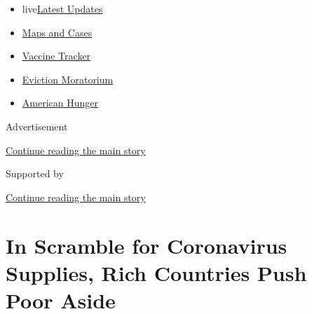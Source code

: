 \begin{itemize}
\tightlist
\item
  live\href{https://www.nytimes3xbfgragh.onion/2020/09/08/world/covid-19-coronavirus.html?name=styln-coronavirus-national\&region=TOP_BANNER\&block=storyline_menu_recirc\&action=click\&pgtype=Article\&impression_id=97e055b1-f1f3-11ea-861d-9f9fbf97bb3c\&variant=undefined}{Latest
  Updates}
\item
  \href{https://www.nytimes3xbfgragh.onion/interactive/2020/us/coronavirus-us-cases.html?name=styln-coronavirus-national\&region=TOP_BANNER\&block=storyline_menu_recirc\&action=click\&pgtype=Article\&impression_id=97e055b2-f1f3-11ea-861d-9f9fbf97bb3c\&variant=undefined}{Maps
  and Cases}
\item
  \href{https://www.nytimes3xbfgragh.onion/interactive/2020/science/coronavirus-vaccine-tracker.html?name=styln-coronavirus-national\&region=TOP_BANNER\&block=storyline_menu_recirc\&action=click\&pgtype=Article\&impression_id=97e07cc0-f1f3-11ea-861d-9f9fbf97bb3c\&variant=undefined}{Vaccine
  Tracker}
\item
  \href{https://www.nytimes3xbfgragh.onion/2020/09/02/your-money/eviction-moratorium-covid.html?name=styln-coronavirus-national\&region=TOP_BANNER\&block=storyline_menu_recirc\&action=click\&pgtype=Article\&impression_id=97e07cc1-f1f3-11ea-861d-9f9fbf97bb3c\&variant=undefined}{Eviction
  Moratorium}
\item
  \href{https://www.nytimes3xbfgragh.onion/interactive/2020/09/02/magazine/food-insecurity-hunger-us.html?name=styln-coronavirus-national\&region=TOP_BANNER\&block=storyline_menu_recirc\&action=click\&pgtype=Article\&impression_id=97e07cc2-f1f3-11ea-861d-9f9fbf97bb3c\&variant=undefined}{American
  Hunger}
\end{itemize}

Advertisement

\protect\hyperlink{after-top}{Continue reading the main story}

Supported by

\protect\hyperlink{after-sponsor}{Continue reading the main story}

\hypertarget{in-scramble-for-coronavirus-supplies-rich-countries-push-poor-aside}{%
\section{In Scramble for Coronavirus Supplies, Rich Countries Push Poor
Aside}\label{in-scramble-for-coronavirus-supplies-rich-countries-push-poor-aside}}

